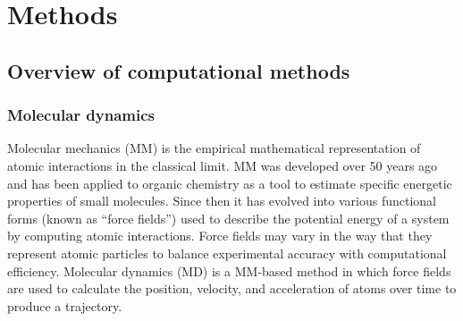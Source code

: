 \chapter{Methods}

\section{Overview of computational methods}

\subsection{Molecular dynamics}

Molecular mechanics (MM) is the empirical mathematical representation of atomic interactions in the classical limit. MM was developed over 50 years ago and has been applied to organic chemistry as a tool to estimate specific energetic properties of small molecules. Since then it has evolved into various functional forms (known as ``force fields'') used to describe the potential energy of a system by computing atomic interactions. Force fields may vary in the way that they represent atomic particles to balance experimental accuracy with computational efficiency. Molecular dynamics (MD) is a MM-based method in which force fields are used to calculate the position, velocity, and acceleration of atoms over time to produce a trajectory.

